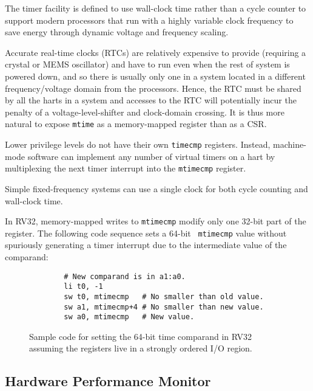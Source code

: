 \begin{commentary}
The timer facility is defined to use wall-clock time rather than a
cycle counter to support modern processors that run with a highly
variable clock frequency to save energy through dynamic voltage and
frequency scaling.

Accurate real-time clocks (RTCs) are relatively expensive to provide
(requiring a crystal or MEMS oscillator) and have to run even when the
rest of system is powered down, and so there is usually only one in a
system located in a different frequency/voltage domain from the
processors.  Hence, the RTC must be shared by all the harts in a
system and accesses to the RTC will potentially incur the penalty of a
voltage-level-shifter and clock-domain crossing.  It is thus more
natural to expose {\tt mtime} as a memory-mapped register than as a CSR.

Lower privilege levels do not have their own {\tt timecmp} registers.
Instead, machine-mode software can implement any number of virtual timers on
a hart by multiplexing the next timer interrupt into the {\tt mtimecmp}
register.

Simple fixed-frequency systems can use a single clock for both cycle
counting and wall-clock time.
\end{commentary}

In RV32, memory-mapped writes to {\tt mtimecmp} modify only one 32-bit
part of the register.  The following code sequence sets a 64-bit {\tt
  mtimecmp} value without spuriously generating a timer interrupt due
to the intermediate value of the comparand:

\begin{figure}[h!]
\begin{center}
\begin{verbatim}
        # New comparand is in a1:a0.
        li t0, -1
        sw t0, mtimecmp   # No smaller than old value.
        sw a1, mtimecmp+4 # No smaller than new value.
        sw a0, mtimecmp   # New value.
\end{verbatim}
\end{center}
\caption{Sample code for setting the 64-bit time comparand in RV32
  assuming the registers live in a strongly ordered I/O region.}
\label{mtimecmph}
\end{figure}

\subsection{Hardware Performance Monitor}

